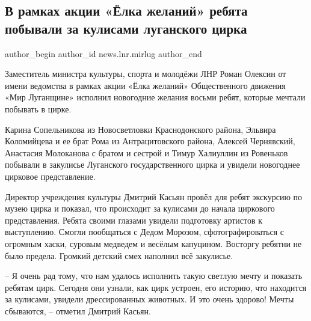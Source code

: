  
 
 
 
 
\subsection{В рамках акции «Ёлка желаний» ребята побывали за кулисами луганского цирка}
\label{sec:30_12_2021.stz.news.lnr.mirlug.1.jolka_zhelanij}

\ifcmt
 author_begin
   author_id news.lnr.mirlug
 author_end
\fi

Заместитель министра культуры, спорта и молодёжи ЛНР Роман Олексин от имени
ведомства в рамках акции «Ёлка желаний» Общественного движения «Мир Луганщине»
исполнил новогодние желания восьми ребят, которые мечтали побывать в цирке.


Карина Сопельникова из Новосветловки Краснодонского района, Эльвира Коломийцева
и ее брат Рома из Антрацитовского района, Алексей Чернявский, Анастасия
Молоканова с братом и сестрой и Тимур Халиуллин из Ровеньков побывали в
закулисье Луганского государственного цирка и увидели новогоднее цирковое
представление.


Директор учреждения культуры Дмитрий Касьян провёл для ребят экскурсию по музею
цирка и показал, что происходит за кулисами до начала циркового представления.
Ребята своими глазами увидели подготовку артистов к выступлению. Смогли
пообщаться с Дедом Морозом, сфотографироваться с огромным хаски, суровым
медведем и весёлым капуцином.  Восторгу ребятни не было предела. Громкий
детский смех наполнил всё закулисье.


– Я очень рад тому, что нам удалось исполнить такую светлую мечту и показать
ребятам цирк. Сегодня они узнали, как цирк устроен, его историю, что находится
за кулисами, увидели дрессированных животных. И это очень здорово! Мечты
сбываются, – отметил Дмитрий Касьян.

